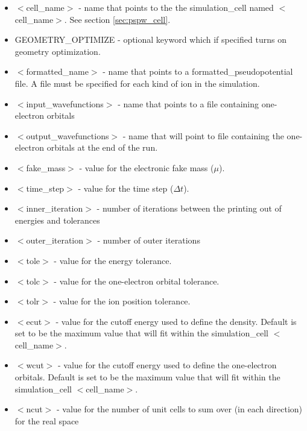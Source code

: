 \begin{itemize}
        \item $<$cell\_name$>$ - name that points to the
              the simulation\_cell named $<$cell\_name$>$. See section \ref{sec:pspw_cell}.
        \item GEOMETRY\_OPTIMIZE - optional keyword which if specified
              turns on geometry optimization.   
        \item $<$formatted\_name$>$ - name that points
              to a formatted\_pseudopotential file.  A file must
              be specified for each kind of ion in the simulation.
        \item $<$input\_wavefunctions$>$ - name that points
              to a file containing one-electron orbitals
        \item $<$output\_wavefunctions$>$ - name that will
              point to file containing the one-electron orbitals at the
              end of the run. 
        \item $<$fake\_mass$>$ - value for the electronic
              fake mass ($\mu$).
        \item $<$time\_step$>$ - value for the time step ($\Delta t$).
        \item $<$inner\_iteration$>$ - number of iterations between the 
              printing out of energies and tolerances
        \item $<$outer\_iteration$>$ - number of outer iterations
        \item $<$tole$>$ - value for the energy tolerance.
        \item $<$tolc$>$ - value for the one-electron orbital tolerance.
        \item $<$tolr$>$ - value for the ion position tolerance.
        \item $<$ecut$>$ - value for the cutoff energy used
                           to define the density.  Default is set
                           to be the maximum value that will fit
                           within the simulation\_cell $<$cell\_name$>$.
        \item $<$wcut$>$ - value for the cutoff energy used
                           to define the one-electron orbitals. Default is set
                           to be the maximum value that will fit
                           within the simulation\_cell $<$cell\_name$>$.
        \item $<$ncut$>$ - value for the number of unit cells
                          to sum over (in each direction) for the real space

\end{itemize}
